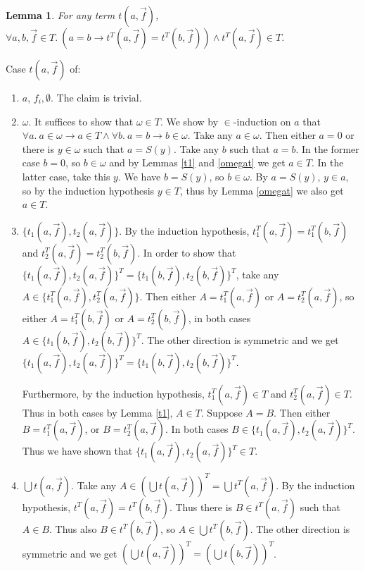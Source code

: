 \documentclass{LMCS}
\newtheorem{lemma}[thm]{Lemma}
\begin{document}
\begin{lemma}\label{trieq}
For any term $t(a, \vec{f})$, $\forall a, b, \vec{f} \in T.\ (a = b \to t^T(a,
\vec{f}) = t^T(b, \vec{f})) \land t^T(a, \vec{f}) \in T$.
\end{lemma}
\proof Case $t(a, \vec{f})$ of:
\begin{enumerate}[$\bullet$]
\item $a$, $f_i, \emptyset$. The claim is trivial.
\item $\omega$. It suffices to show that $\omega \in T$. We show by
$\in$-induction on $a$ that $\forall a.\ a \in \omega \to a \in T \land
\forall b.\ a = b \to b \in \omega$. Take any $a \in \omega$. 
Then either $a = 0$ or there is $y \in \omega$ such that $a = S(y)$. Take
any $b$ such that $a = b$. In the former case $b = 0$, so $b \in \omega$ and by Lemmas
\ref{t1} and \ref{omegat} we get $a \in T$. In the latter case, take this $y$. We have $b = S(y)$,
so $b \in \omega$. By $a = S(y)$, $y \in a$, so by the induction hypothesis
$y \in T$, thus by Lemma \ref{omegat} we also get $a \in T$. 
\item $\{ t_1(a, \vec{f}), t_2(a, \vec{f}) \}$. By the induction hypothesis, 
$t_1^T(a, \vec{f}) = t_1^T(b, \vec{f})$ and $t_2^T(a, \vec{f}) = t_2^T(b, \vec{f})$.
In order to show that $\{ t_1(a, \vec{f}), t_2(a, \vec{f}) \}^T =
\{ t_1(b, \vec{f}), t_2(b, \vec{f}) \}^T$, take any $A \in \{ t_1^T(a, \vec{f}), t_2^T(a, \vec{f}) \}$. Then
either $A = t_1^T(a, \vec{f})$ or $A = t_2^T(a, \vec{f})$, so either
$A = t_1^T(b, \vec{f})$ or $A = t_2^T(b, \vec{f})$, in both cases $A \in \{
t_1(b, \vec{f}) , t_2(b, \vec{f}) \}^T$. The other direction is symmetric and
we get $\{ t_1(a, \vec{f}), t_2(a, \vec{f}) \}^T = \{ t_1(b, \vec{f}), t_2(b, \vec{f}) \}^T$. 

Furthermore, by the induction hypothesis, $t_1^T(a, \vec{f}) \in T$ and
$t_2^T(a, \vec{f}) \in T$. Thus in both cases by Lemma \ref{t1}, $A \in T$. Suppose $A = B$.
Then either $B = t_1^T(a, \vec{f})$, or $B = t_2^T(a,
\vec{f})$. In both cases $B \in \{ t_1(a, \vec{f}), t_2(a, \vec{f}) \}^T$. Thus
we have shown that $\{ t_1(a, \vec{f}), t_2(a, \vec{f}) \}^T \in T$. 
\item $\bigcup t(a, \vec{f})$. Take any $A \in (\bigcup t(a, \vec{f}))^T
= \bigcup t^T(a, \vec{f})$. By the induction hypothesis, $t^T(a, \vec{f}) =
t^T(b, \vec{f})$. Thus there is $B \in t^T(a, \vec{f})$ such that
$A \in B$. Thus also $B \in t^T(b, \vec{f})$, so $A \in \bigcup t^T(b,
\vec{f})$. The other direction is symmetric and we get 
$(\bigcup t(a, \vec{f}))^T = (\bigcup t(b, \vec{f}))^T$. 


\end{enumerate}
\end{document}
